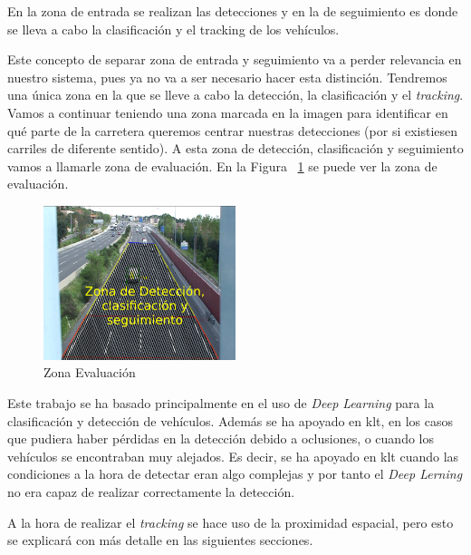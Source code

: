 En la zona de entrada se realizan las detecciones y en la de seguimiento es donde se lleva a cabo la clasificación y el tracking de los vehículos.

Este concepto de separar zona de entrada y seguimiento va a perder relevancia en nuestro sistema, pues ya no va a ser necesario hacer esta distinción. Tendremos una única zona en la que se lleve a cabo la detección, la clasificación y el \textit{tracking}. Vamos a continuar teniendo una zona marcada en la imagen para identificar en qué parte de la carretera queremos centrar nuestras detecciones (por si existiesen carriles de diferente sentido). A esta zona de detección, clasificación y seguimiento vamos a llamarle zona de evaluación. En la Figura ~\ref{fig.nueva_zona} se puede ver la zona  de evaluación.

\begin{figure}[H] 
\begin{center}
	\includegraphics[width=0.5\textwidth]{figures/Diseno_global/nueva_zona.png}
   \caption{Zona Evaluación}
	\label{fig.nueva_zona}
\end{center}
\end{figure}


Este trabajo se ha basado principalmente en el uso de \textit{Deep Learning} para la clasificación y detección de vehículos. Además se ha apoyado en \acrfull{klt}, en los casos que pudiera haber pérdidas en la detección debido a oclusiones, o cuando los vehículos se encontraban muy alejados. Es decir, se ha apoyado en \acrshort{klt} cuando las condiciones a la hora de detectar eran algo complejas y por tanto el \textit{Deep Lerning} no era capaz de realizar correctamente la detección.

A la hora de realizar el \textit{tracking} se hace uso de la proximidad espacial, pero esto se explicará con más detalle en las siguientes secciones.


